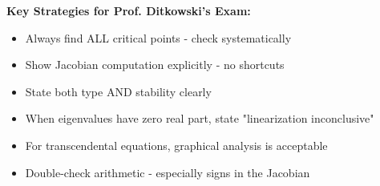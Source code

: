 \documentclass[12pt]{article}
\begin{document}
\begin{hint}
\textbf{Key Strategies for Prof. Ditkowski's Exam:}
\begin{itemize}
    \item Always find ALL critical points - check systematically
    \item Show Jacobian computation explicitly - no shortcuts
    \item State both type AND stability clearly
    \item When eigenvalues have zero real part, state "linearization inconclusive"
    \item For transcendental equations, graphical analysis is acceptable
    \item Double-check arithmetic - especially signs in the Jacobian
\end{itemize}
\end{hint}
\end{document}
